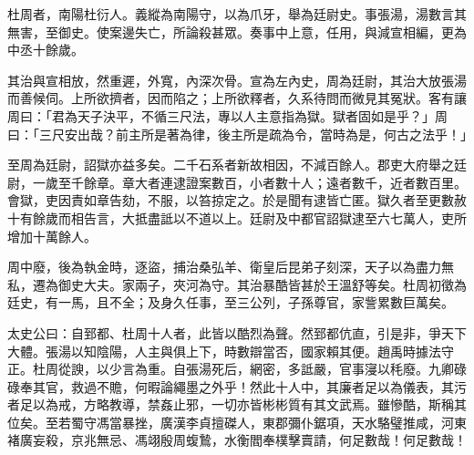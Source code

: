 \begin{pinyinscope}
杜周者，南陽杜衍人。義縱為南陽守，以為爪牙，舉為廷尉史。事張湯，湯數言其無害，至御史。使案邊失亡，所論殺甚眾。奏事中上意，任用，與減宣相編，更為中丞十餘歲。

其治與宣相放，然重遲，外寬，內深次骨。宣為左內史，周為廷尉，其治大放張湯而善候伺。上所欲擠者，因而陷之；上所欲釋者，久系待問而微見其冤狀。客有讓周曰：「君為天子決平，不循三尺法，專以人主意指為獄。獄者固如是乎？」周曰：「三尺安出哉？前主所是著為律，後主所是疏為令，當時為是，何古之法乎！」

至周為廷尉，詔獄亦益多矣。二千石系者新故相因，不減百餘人。郡吏大府舉之廷尉，一歲至千餘章。章大者連逮證案數百，小者數十人；遠者數千，近者數百里。會獄，吏因責如章告劾，不服，以笞掠定之。於是聞有逮皆亡匿。獄久者至更數赦十有餘歲而相告言，大抵盡詆以不道以上。廷尉及中都官詔獄逮至六七萬人，吏所增加十萬餘人。

周中廢，後為執金時，逐盜，捕治桑弘羊、衛皇后昆弟子刻深，天子以為盡力無私，遷為御史大夫。家兩子，夾河為守。其治暴酷皆甚於王溫舒等矣。杜周初徵為廷史，有一馬，且不全；及身久任事，至三公列，子孫尊官，家訾累數巨萬矣。

太史公曰：自郅都、杜周十人者，此皆以酷烈為聲。然郅都伉直，引是非，爭天下大體。張湯以知陰陽，人主與俱上下，時數辯當否，國家賴其便。趙禹時據法守正。杜周從諛，以少言為重。自張湯死后，網密，多詆嚴，官事寖以秏廢。九卿碌碌奉其官，救過不贍，何暇論繩墨之外乎！然此十人中，其廉者足以為儀表，其污者足以為戒，方略教導，禁姦止邪，一切亦皆彬彬質有其文武焉。雖慘酷，斯稱其位矣。至若蜀守馮當暴挫，廣漢李貞擅磔人，東郡彌仆鋸項，天水駱璧推咸，河東褚廣妄殺，京兆無忌、馮翊殷周蝮鷙，水衡閻奉樸擊賣請，何足數哉！何足數哉！


\end{pinyinscope}
